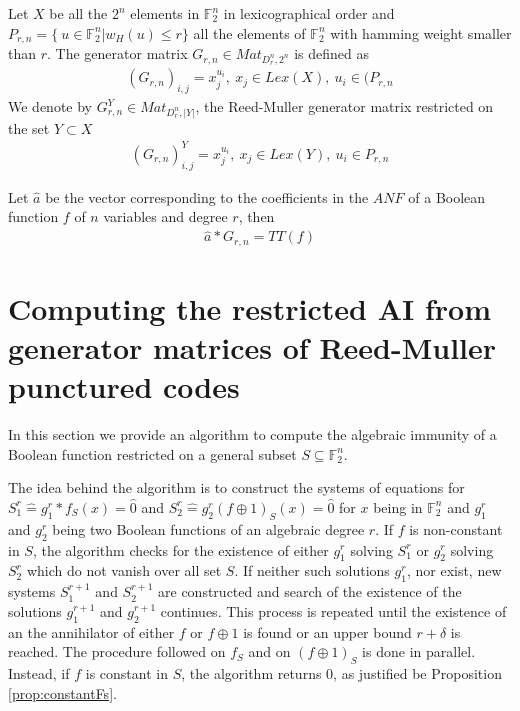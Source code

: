 \documentclass[11pt]{llncs}
\begin{document}
\begin{definition}\label{rmGenerator}
	Let $X$ be all the $2^n$ elements in $\mathbb{F}_2^n$ in lexicographical order and $P_{r,n} = \{\ u\in \mathbb{F}_2^n | w_H(u) \leq r\}$ all the elements of $\mathbb{F}_2^n$ with hamming weight smaller than $r$. The generator matrix $G_{r,n}\in Mat_{D_r^n,2^n}$ is defined as
	\begin{align*}
	\left(G_{r,n}\right)_{i,j} = x_j^{u_i}, \ x_j \in Lex\left(X\right),\ u_i \in (P_{r,n}
	\end{align*}
	We denote by $G_{r,n}^Y\in Mat_{D_r^n,|Y|}$, the Reed-Muller generator matrix restricted on the set $Y \subset X$
	\begin{align*}
	\left(G_{r,n}\right)^Y_{i,j} = x_j^{u_i}, \ x_j \in Lex(Y),\ u_i \in P_{r,n}
	\end{align*}
\end{definition}

\begin{remark}
	Let $\hat{a}$ be the vector corresponding to the coefficients in the $ANF$ of a Boolean function $f$ of $n$ variables and degree $r$, then
	\begin{align*}
	\hat{a} * G_{r,n} = TT(f)
	\end{align*}
\end{remark}




















\section{Computing the restricted AI from generator matrices of Reed-Muller punctured codes}\label{sec:RMapproach}

In this section we provide an algorithm to compute the algebraic immunity of a Boolean function restricted on a general subset $S \subseteq \mathbb{F}_2^n$. 


The idea behind the algorithm is to construct the systems of equations for $S_1^r \hat{=}g_1^r*f_S (x)= \hat{0}$ and $S_2^r\hat{=}g_2^r (f\oplus 1)_S (x) = \hat{0}$ for $x$ being in $\mathbb{F}_2^n$ and $g_1^r$ and $g_2^r$ being two Boolean functions of an algebraic degree $r$.
If $f$ is non-constant in $S$, the algorithm checks for the existence of either $g_1^r$ solving $S_1^r$ or $g_2^r$ solving $S_2^r$ which do not vanish over all set $S$. If neither such solutions $g_1^r$, nor exist, new systems $S_1^{r+1}$ and $S_2^{r+1}$ are constructed and search of the existence of the solutions $g_{1}^{r+1}$ and $g_2^{r+1}$ continues. This process is repeated until the existence of an the annihilator of either $f$ or $f\oplus 1$ is found or an upper bound $r+\delta$ is reached. The procedure followed on $f_S$ and on $(f\oplus 1)_S$ is done in parallel.
Instead, if $f$ is constant in $S$, the algorithm returns $0$, as justified be Proposition \ref{prop:constantFs}.
\end{document}

